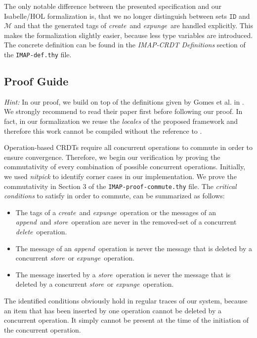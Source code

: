 \documentclass[11pt,a4paper,DIV=11]{article}
\newcommand{\create}{\textit{create}}
\newcommand{\delete}{\textit{delete}}
\newcommand{\store}{\textit{store}}
\newcommand{\append}{\textit{append}}
\newcommand{\expunge}{\textit{expunge}}
\begin{document}
The only notable difference between the presented specification and our Isabelle/HOL
formalization is, that we no longer distinguish between sets $\texttt{ID}$ and
$\mathcal{M}$ and that the generated tags of \create\ and \expunge\ are handled
explicitly. This makes the formalization slightly easier, because less type variables
are introduced. The concrete definition can be found in the \textit{IMAP-CRDT Definitions}
section of the \texttt{IMAP-def.thy} file.


\subsection{Proof Guide}

\textit{Hint:} In our proof, we build on top of the definitions given by Gomes et al{.}
in \cite{gomes_crdtisabelle}. We strongly recommend to read their paper first before
following our proof. In fact, in our formalization we reuse the \textit{locales} of the
proposed framework and therefore this work cannot be compiled without the reference
to \cite{gomes_crdtafp}.

Operation-based CRDTs require all concurrent operations to commute in order to ensure
convergence. Therefore, we begin our verification by proving the commutativity of every
combination of possible concurrent operations. Initially, we used \textit{nitpick} to
identify corner cases in our implementation. We prove the commutativity in Section 3
of the \texttt{IMAP-proof-commute.thy} file. The \textit{critical conditions} to satisfy
in order to commute, can be summarized as follows:
\begin{itemize}
  \item The tags of a \create\ and \expunge\ operation or the messages of an
  \append\ and \store\ operation are never in the removed-set of a concurrent
  \delete\ operation.
  \item The message of an \append\ operation is never the message that is
  deleted by a concurrent \store\ or \expunge\ operation.
  \item The message inserted by a \store\ operation is never the message
  that is deleted by a concurrent \store\ or \expunge\ operation.
\end{itemize}

The identified conditions obviously hold in regular traces of our system, because
an item that has been inserted by one operation cannot be deleted by a concurrent
operation. It simply cannot be present at the time of the initiation of the
concurrent operation.
\end{document}

